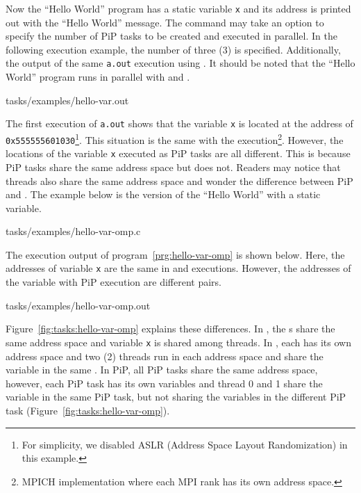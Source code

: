 Now the ``Hello World'' program has a static variable
{\tt x} and its address is printed out with the ``Hello World''
message. The  command may take an option to specify
the number of PiP tasks to be created and executed in parallel. In the
following execution example, the number of three (3) is
specified. Additionally, the output of the same {\tt a.out} execution
using . It should be noted that the ``Hello World'' program runs in
parallel with  and . 

 {tasks/examples/hello-var.out}

The first execution of {\tt a.out} shows that the variable {\tt x} is
located at the address of {\tt 0x555555601030}\footnote{For
simplicity, we disabled ASLR (Address Space Layout Randomization) in
this example.}. This situation is the 
same with the  execution\footnote{MPICH implementation where each
MPI rank has its own address space.}. However, the locations of the
variable {\tt x} executed as PiP tasks are all different.
This is because PiP tasks share the same address space but  does
not. Readers may notice that threads also share the same address
space and wonder the difference between PiP and . The example
below is the  version of the ``Hello World'' with a static
variable. 

 {tasks/examples/hello-var-omp.c}

The execution output of program~\ref{prg:hello-var-omp} is shown
below. Here, the addresses of variable {\tt x} are the same in 
and  executions. However, the addresses of the variable with PiP
execution are different pairs. 

 {tasks/examples/hello-var-omp.out}

Figure~\ref{fig:tasks:hello-var-omp} explains these differences. In
, the s share the same address space
and variable {\tt x} is shared among threads. In , each
 has its own address space and two (2) threads run
in each address space and share the variable in the same . In PiP, all PiP tasks share the same address space,
however, each PiP task has its own variables and thread 0 and 1 share
the variable in the same PiP task, but not sharing the variables in
the different PiP task (Figure~\ref{fig:tasks:hello-var-omp}).

